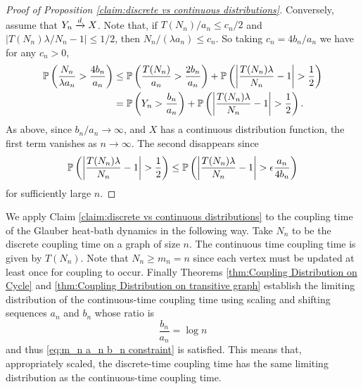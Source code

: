 \begin{proof}[Proof of Proposition \ref{claim:discrete vs continuous distributions}]
		Conversely, assume that $Y_n \xrightarrow{d} X$. Note that, if $T(N_n)/a_n \leq c_n/2$ and $|T(N_n) \lambda / N_n - 1| \leq 1/2$, then $N_n / (\lambda a_n )\leq c_n$. So taking $c_n = 4b_n/a_n$ we have for any $c_n > 0$,
		\begin{align}
			\mathbb{P}\left(\frac{N_n}{\lambda a_n} > \frac{4 b_n}{a_n} \right) &\leq \mathbb{P}\left(\frac{T(N_n)}{a_n} > \frac{2 b_n}{a_n}\right) + \mathbb{P}\left(\left|\frac{T(N_n)\lambda}{N_n} - 1\right| > \frac{1}{2}\right)\\
			&= \mathbb{P}\left(Y_n > \frac{b_n}{a_n}\right) + \mathbb{P}\left(\left|\frac{T(N_n)\lambda}{N_n} - 1\right| > \frac{1}{2}\right).
		\end{align}
		As above, since $b_n/a_n \rightarrow \infty$, and $X$ has a continuous distribution function, 
		the first term vanishes as $n \rightarrow \infty$. The second disappears since 
		\begin{equation}
			\mathbb{P}\left(\left|\frac{T(N_n)\lambda}{N_n} - 1\right| > \frac{1}{2}\right) \leq \mathbb{P}\left(\left|\frac{T(N_n)\lambda}{N_n} - 1\right| > \epsilon\frac{a_n}{4 b_n} \right)
		\end{equation}
		for sufficiently large $n$.
	\end{proof}


	\begin{remark}
		We apply Claim \ref{claim:discrete vs continuous distributions} to the coupling time of the Glauber heat-bath dynamics in the following way. Take $N_n$ to be the discrete coupling time on a graph of size $n$. The continuous time coupling time is given by $T(N_n)$. Note that $N_n \geq m_n = n$ since each vertex must be updated at least once for coupling to occur. Finally Theorems \ref{thm:Coupling Distribution on Cycle} and \ref{thm:Coupling Distribution on transitive graph} establish the limiting distribution of the continuous-time coupling time using scaling and shifting sequences $a_n$ and $b_n$ whose ratio is 
		\begin{equation}
			\frac{b_n}{a_n} = \log n
		\end{equation}
		and thus \eqref{eq:m_n a_n b_n constraint} is satisfied. This means that, appropriately scaled, the discrete-time coupling time has the same limiting distribution as the continuous-time coupling time.
	\end{remark}

